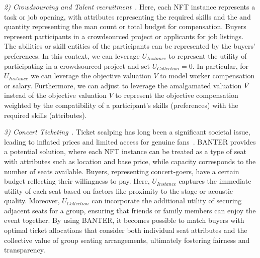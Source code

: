 \documentclass[conference]{IEEEtran}
\newcommand{\1}[1]{\mathds{1}\left[#1\right]}
\theoremstyle{plain}
\newcommand{\method}{\textsf{BANTER}\xspace}
\begin{document}
{    \textit{2) Crowdsourcing and Talent recruitment}~\cite{wang2021efficient, chai2018incentive, zhao2020predictive, yao2022knowledge}. Here, each NFT instance represents a task or job opening, with attributes representing the required skills and the and quantity representing the man count or total budget for compensation. Buyers represent participants in a crowdsourced project or applicants for job listings. The abilities or skill entities of the participants can be represented by the buyers' preferences. In this context, we can leverage $U_\textit{Instance}$ to represent the utility of participating in a crowdsourced project and set $U_\textit{Collection}=0$. In particular, for $U_\textit{Instance}$ we can leverage the objective valuation $V$ to model worker compensation or salary. Furthermore, we can adjust  to leverage the amalgamated valuation $\Tilde{V}$ instead of the objective valuation $V$ to represent the objective compensation weighted by the compatibility of a participant’s skills (preferences) with the required skills (attributes).
    

    \textit{3) Concert Ticketing}~\cite{sastiono2016studies, stein2014will}. Ticket scalping has long been a significant societal issue, leading to inflated prices and limited access for genuine fans~\cite{stein2014will}. \method provides a potential solution, where each NFT instance can be treated as a type of seat with attributes such as location and base price, while capacity corresponds to the number of seats available. Buyers, representing concert-goers, have a certain budget reflecting their willingness to pay. Here, $U_{\textit{Instance}}$ captures the immediate utility of each seat based on factors like proximity to the stage or acoustic quality. Moreover, $U_{\textit{Collection}}$ can incorporate the additional utility of securing adjacent seats for a group, ensuring that friends or family members can enjoy the event together. By using \method, it becomes possible to match buyers with optimal ticket allocations that consider both individual seat attributes and the collective value of group seating arrangements, ultimately fostering fairness and transparency.
    
    
    
}
\end{document}
